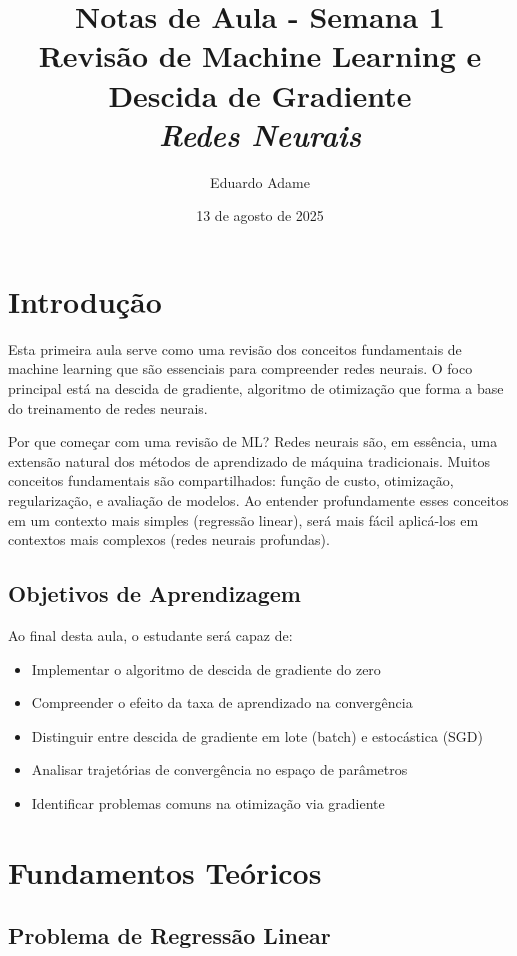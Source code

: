 \documentclass[a4paper,12pt]{article}
\title{Notas de Aula - Semana 1 \\
       \large Revisão de Machine Learning e Descida de Gradiente\\
       \itshape Redes Neurais}
\author{Eduardo Adame}
\date{13 de agosto de 2025}
\begin{document}
\maketitle

\tableofcontents
\newpage

\section{Introdução}

Esta primeira aula serve como uma revisão dos conceitos fundamentais de machine learning que são essenciais para compreender redes neurais. O foco principal está na descida de gradiente, algoritmo de otimização que forma a base do treinamento de redes neurais.

Por que começar com uma revisão de ML? Redes neurais são, em essência, uma extensão natural dos métodos de aprendizado de máquina tradicionais. Muitos conceitos fundamentais são compartilhados: função de custo, otimização, regularização, e avaliação de modelos. Ao entender profundamente esses conceitos em um contexto mais simples (regressão linear), será mais fácil aplicá-los em contextos mais complexos (redes neurais profundas).

\subsection{Objetivos de Aprendizagem}
Ao final desta aula, o estudante será capaz de:
\begin{itemize}
    \item Implementar o algoritmo de descida de gradiente do zero
    \item Compreender o efeito da taxa de aprendizado na convergência
    \item Distinguir entre descida de gradiente em lote (batch) e estocástica (SGD)
    \item Analisar trajetórias de convergência no espaço de parâmetros
    \item Identificar problemas comuns na otimização via gradiente
\end{itemize}

\section{Fundamentos Teóricos}

\subsection{Problema de Regressão Linear}
\end{document}
